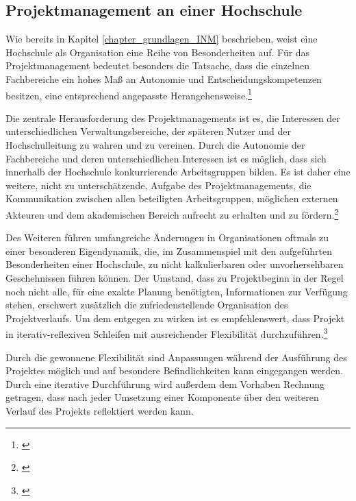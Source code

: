 
\subsection{Projektmanagement an einer Hochschule}
\label{subsection_projektmanagement_hochschule}
Wie bereits in Kapitel \ref{chapter_grundlagen_INM} beschrieben, weist eine Hochschule als Organisation eine Reihe von Besonderheiten auf. Für das Projektmanagement bedeutet besonders die Tatsache, dass die einzelnen Fachbereiche ein hohes Maß an Autonomie und Entscheidungskompetenzen besitzen, eine entsprechend angepasste Herangehensweise.\footnote{\cite{hansen_business_2009}}

Die zentrale Herausforderung des Projektmanagements ist es, die Interessen der unterschiedlichen Verwaltungsbereiche, der späteren Nutzer und der Hochschulleitung zu wahren und zu vereinen. Durch die Autonomie der Fachbereiche und deren unterschiedlichen Interessen ist es möglich, dass sich innerhalb der Hochschule konkurrierende Arbeitsgruppen bilden. Es ist daher eine weitere, nicht zu unterschätzende, Aufgabe des Projektmanagements, die Kommunikation zwischen allen beteiligten Arbeitsgruppen, möglichen externen Akteuren und dem akademischen Bereich aufrecht zu erhalten und zu fördern.\footnote{\cite{altvater_organisation_2007}}

Des Weiteren führen umfangreiche Änderungen in Organisationen oftmals zu einer besonderen Eigendynamik, die, im Zusammenspiel mit den aufgeführten Besonderheiten einer Hochschule, zu nicht kalkulierbaren oder unvorhersehbaren Geschehnissen führen können. Der Umstand, dass zu Projektbeginn in der Regel noch nicht alle, für eine exakte Planung benötigten, Informationen zur Verfügung stehen, erschwert zusätzlich die zufriedenstellende Organisation des Projektverlaufs. Um dem entgegen zu wirken ist es empfehlenswert, dass Projekt in iterativ-reflexiven Schleifen mit ausreichender Flexibilität durchzuführen.\footnote{\cite{hansen_business_2009}}

Durch die gewonnene Flexibilität sind Anpassungen während der Ausführung des Projektes möglich und auf besondere Befindlichkeiten kann eingegangen werden. Durch eine iterative Durchführung wird außerdem dem Vorhaben Rechnung getragen, dass nach jeder Umsetzung einer Komponente über den weiteren Verlauf des Projekts reflektiert werden kann.

